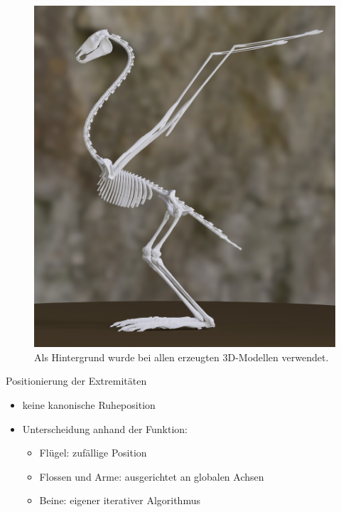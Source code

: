 \documentclass{beamer}
\begin{document}
\begin{frame}[focus]
 \begin{figure}
  \centering
  \includegraphics[height=0.85\textheight]{../../java_skeleton_generation/example_skeletons/bird.jpg}
  \caption{\scriptsize Als Hintergrund wurde bei allen erzeugten 3D-Modellen \cite{background} verwendet.}
 \end{figure}
\end{frame}

\begin{frame}{Positionierung der Extremitäten}
 \begin{itemize}
  \item keine kanonische Ruheposition
  \item Unterscheidung anhand der Funktion:
  \begin{itemize}
   \item Flügel: zufällige Position
   \item Flossen und Arme: ausgerichtet an globalen Achsen
   \item Beine: eigener iterativer Algorithmus
  \end{itemize}
 \end{itemize}
\end{frame}
\end{document}
